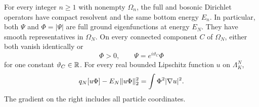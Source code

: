 \begin{lemma}\label{setup:ground}
For every integer $n\ge1$ with nonempty $\Omega_n$, the full and
bosonic Dirichlet operators
have compact resolvent and the same bottom energy $E_n$.
In particular, both $\Psi$ and $\Phi=|\Psi|$ are full ground
eigenfunctions at energy $E_N$. They have smooth representatives in
$\Omega_N$. On every connected component $C$ of $\Omega_N$, either
both vanish identically or
\[
 \Phi>0,\qquad \Psi=e^{i\vartheta_C}\Phi
\]
for one constant $\vartheta_C\in\mathbb R$.
For every real bounded Lipschitz function $u$ on $\Lambda_K^N$,
\begin{equation}\label{setup:multiplier}
 q_N[u\Phi]-E_N\lVert u\Phi\rVert_2^2
                 =\int\Phi^2|\nabla u|^2.
\end{equation}
The gradient on the right includes all particle coordinates.
\end{lemma}

